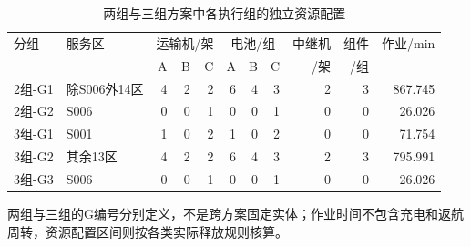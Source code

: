 \begin{table}[htbp]\centering\small\setlength{\tabcolsep}{4pt}
\caption{两组与三组方案中各执行组的独立资源配置}\label{tab:q4_each_group}
\begin{tabular}{llrrrrrrrrr}\toprule
分组 & 服务区 & \multicolumn{3}{c}{运输机/架} & \multicolumn{3}{c}{电池/组} & 中继机 & 组件 & 作业/min\\
 & & A & B & C & A & B & C & /架 & /组 & \\\midrule
2组-G1 & 除S006外14区 & 4 & 2 & 2 & 6 & 4 & 3 & 2 & 3 & 867.745\\
2组-G2 & S006 & 0 & 0 & 1 & 0 & 0 & 1 & 0 & 0 & 26.026\\
3组-G1 & S001 & 1 & 0 & 2 & 1 & 0 & 2 & 0 & 0 & 71.754\\
3组-G2 & 其余13区 & 4 & 2 & 2 & 6 & 4 & 3 & 2 & 3 & 795.991\\
3组-G3 & S006 & 0 & 0 & 1 & 0 & 0 & 1 & 0 & 0 & 26.026\\
\bottomrule\end{tabular}
\par\smallskip\footnotesize 两组与三组的G编号分别定义，不是跨方案固定实体；作业时间不包含充电和返航周转，资源配置区间则按各类实际释放规则核算。
\end{table}
